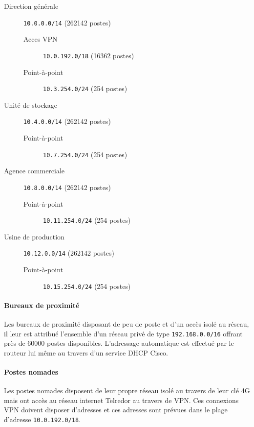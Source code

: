 \documentclass{article}
\newcommand{\tlr}{Telredor\xspace}
\begin{document}
\begin{description}
	\item[Direction générale] \texttt{10.0.0.0/14} (262142 postes)
	\begin{description}
		\item[Acces VPN] \texttt{10.0.192.0/18} (16362 postes)
		\item[Point-à-point] \texttt{10.3.254.0/24} (254 postes)
	\end{description}
	\item[Unité de stockage] \texttt{10.4.0.0/14} (262142 postes)
	\begin{description}
		\item[Point-à-point] \texttt{10.7.254.0/24} (254 postes)
	\end{description}
	\item[Agence commerciale] \texttt{10.8.0.0/14} (262142 postes)
	\begin{description}
		\item[Point-à-point] \texttt{10.11.254.0/24} (254 postes)
	\end{description}
	\item[Usine de production] \texttt{10.12.0.0/14} (262142 postes)
	\begin{description}
		\item[Point-à-point] \texttt{10.15.254.0/24} (254 postes)
	\end{description}
\end{description}

\bigskip

\paragraph{Bureaux de proximité} Les bureaux de proximité disposant de peu de poste et d'un accès isolé au réseau, il leur est attribué l'ensemble d'un réseau privé de type \texttt{192.168.0.0/16} offrant près de 60000 postes disponibles.
L'adressage automatique est effectué par le routeur lui même au travers d'un service DHCP Cisco.

\paragraph{Postes nomades} Les postes nomades disposent de leur propre réseau isolé au travers de leur clé 4G mais ont accès au réseau internet \tlr au travers de VPN.
Ces connexions VPN doivent disposer d'adresses et ces adresses sont prévues dans le plage d'adresse \texttt{10.0.192.0/18}.
\end{document}
